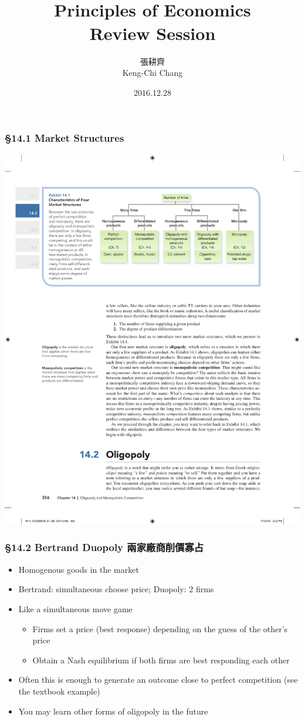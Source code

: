 \documentclass[12pt, xcolor=dvipsnames]{beamer}
\title{\bf{\Huge {}\\[-2mm] Principles of Economics \\[2mm] Review Session}}
\author{{\Large 張耕齊\\[2mm] Keng-Chi Chang}}
\institute{{}\\[-7mm]\footnotesize\tt{<r03323070@ntu.edu.tw>}\\[2mm]}
\date{\large 2016.12.28}
\begin{document}
\fontsize{12}{14pt}\selectfont

\begin{frame}
\titlepage
\end{frame}





\begin{frame}
\frametitle{\bf §14.1 Market Structures}
\begin{center}
\includegraphics[width=\linewidth]{figures/14-1.pdf}
\end{center}
\end{frame}



\begin{frame}
\frametitle{\bf §14.2 Bertrand Duopoly 兩家廠商削價寡占}
\begin{itemize}
\item Homogenous goods in the market
\item Bertrand: simultaneous choose price; Duopoly: 2 firms
\item Like a simultaneous move game
\begin{itemize}
\item Firms set a price (best response) depending on the guess of the other's price
\item Obtain a Nash equilibrium if both firms are best responding each other
\end{itemize}
\item Often this is enough to generate an outcome close to perfect competition (see the textbook example)
\item You may learn other forms of oligopoly in the future
\end{itemize}
\end{frame}
\end{document}

